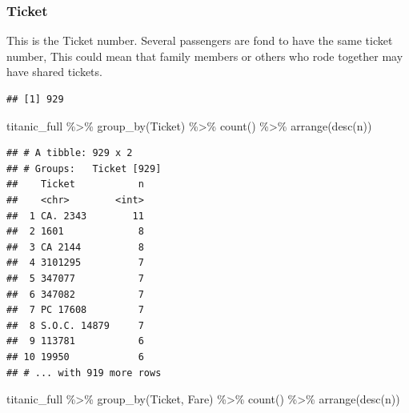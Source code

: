 \documentclass[
]{article}
\newenvironment{Shaded}{\begin{snugshade}}{\end{snugshade}}
\newcommand{\FunctionTok}[1]{\textcolor[rgb]{0.00,0.00,0.00}{#1}}
\newcommand{\NormalTok}[1]{#1}
\newcommand{\SpecialCharTok}[1]{\textcolor[rgb]{0.00,0.00,0.00}{#1}}
\begin{document}
\hypertarget{ticket}{%
\subsubsection{\texorpdfstring{\textbf{Ticket}}{Ticket}}\label{ticket}}

This is the Ticket number. Several passengers are fond to have the same
ticket number, This could mean that family members or others who rode
together may have shared tickets.

\begin{Shaded}
\end{Shaded}

\begin{verbatim}
## [1] 929
\end{verbatim}

\begin{Shaded}
\begin{Highlighting}[]
\NormalTok{titanic\_full }\SpecialCharTok{\%\textgreater{}\%}
  \FunctionTok{group\_by}\NormalTok{(Ticket) }\SpecialCharTok{\%\textgreater{}\%}
  \FunctionTok{count}\NormalTok{() }\SpecialCharTok{\%\textgreater{}\%}
  \FunctionTok{arrange}\NormalTok{(}\FunctionTok{desc}\NormalTok{(n))}
\end{Highlighting}
\end{Shaded}

\begin{verbatim}
## # A tibble: 929 x 2
## # Groups:   Ticket [929]
##    Ticket           n
##    <chr>        <int>
##  1 CA. 2343        11
##  2 1601             8
##  3 CA 2144          8
##  4 3101295          7
##  5 347077           7
##  6 347082           7
##  7 PC 17608         7
##  8 S.O.C. 14879     7
##  9 113781           6
## 10 19950            6
## # ... with 919 more rows
\end{verbatim}

\begin{Shaded}
\begin{Highlighting}[]
\NormalTok{titanic\_full }\SpecialCharTok{\%\textgreater{}\%}
  \FunctionTok{group\_by}\NormalTok{(Ticket, Fare) }\SpecialCharTok{\%\textgreater{}\%}
  \FunctionTok{count}\NormalTok{() }\SpecialCharTok{\%\textgreater{}\%}
  \FunctionTok{arrange}\NormalTok{(}\FunctionTok{desc}\NormalTok{(n))}
\end{Highlighting}
\end{Shaded}
\end{document}
